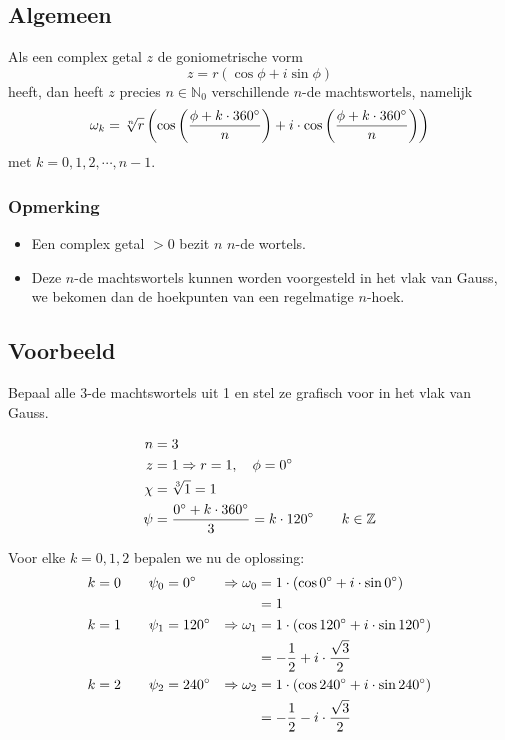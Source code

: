 \documentclass[12pt,twoside,a4paper]{article}
\begin{document}
\subsection{Algemeen}

Als een complex getal $z$ de goniometrische vorm
\[ z = r ( \cos \phi + i \sin \phi )\]
heeft, dan heeft $z$ precies $n\in\mathbb{N}_0$ verschillende $n$-de machtswortels, namelijk
\[ \omega_k = \sqrt[n]{r}\left( \cos\left( \dfrac{\phi + k \cdot 360^\circ}{n} \right) + i \cdot \cos\left( \dfrac{\phi + k \cdot 360^\circ}{n} \right) \right)\]
met $k = 0, 1, 2, \cdots , n-1$.

\subsubsection*{Opmerking}
\begin{itemize}
\item Een complex getal $>0$ bezit $n$ $n$-de wortels.
\item Deze $n$-de machtswortels kunnen worden voorgesteld in het vlak van Gauss, we bekomen dan de hoekpunten van een regelmatige $n$-hoek.
\end{itemize}

\subsection{Voorbeeld}

Bepaal alle $3$-de machtswortels uit 1 en stel ze grafisch voor in het vlak van Gauss.

\begin{align*}
  n &= 3\\
  z &= 1 \Rightarrow r = 1, \quad \phi = 0^\circ\\
  \chi &= \sqrt[3]{1} = 1\\
  \psi &= \dfrac{0^\circ + k \cdot 360^\circ}{3} = k \cdot 120^\circ \qquad k\in\mathbb{Z}
\end{align*}

Voor elke $k=0, 1, 2$ bepalen we nu de oplossing:
\begin{align*}
  k=0 \qquad \psi_0 &= 0^\circ   &\Rightarrow \omega_0 &= 1 \cdot (\cos 0^\circ + i \cdot \sin 0^\circ)\\
            &             &       &= 1\\
  k=1 \qquad \psi_1 &= 120^\circ &\Rightarrow \omega_1 &= 1 \cdot (\cos 120^\circ + i \cdot \sin 120^\circ)\\
            &             &       &= -\dfrac{1}{2} + i \cdot \dfrac{\sqrt{3}}{2}\\
  k=2 \qquad \psi_2 &= 240^\circ &\Rightarrow \omega_2 &= 1 \cdot (\cos 240^\circ + i \cdot \sin 240^\circ)\\
            &             &       &= -\dfrac{1}{2} - i \cdot \dfrac{\sqrt{3}}{2}\\
\end{align*}
\end{document}
